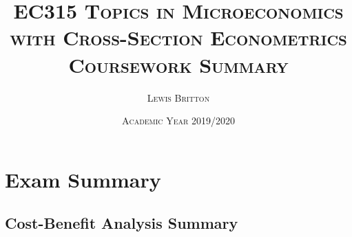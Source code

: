 \documentclass[11pt, english]{article}
\begin{document}
                               
                                              
                       
        \title{\textsc{EC315 Topics in Microeconomics with Cross-Section Econometrics\\ Coursework Summary}}
        \author{\textsc{Lewis Britton}}
        \date{\textsc{Academic Year 2019/2020}}
        \maketitle

\newpage
                         
                                                                           
        \renewcommand{\contentsname}{Table of Contents}
                                       
        \tableofcontents

\newpage 


\section{Exam Summary}

	\subsection{Cost-Benefit Analysis Summary}
\end{document}
